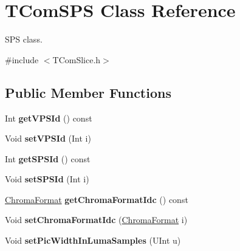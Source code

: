 \hypertarget{class_t_com_s_p_s}{}\section{T\+Com\+S\+PS Class Reference}
\label{class_t_com_s_p_s}


S\+PS class.  




{\ttfamily \#include $<$T\+Com\+Slice.\+h$>$}

\subsection*{Public Member Functions}
\begin{DoxyCompactItemize}
\item 
\mbox{\label{class_t_com_s_p_s_af446194c266dd719fd5c685de31ae8d3}} 
Int {\bfseries get\+V\+P\+S\+Id} () const
\item 
\mbox{\label{class_t_com_s_p_s_abf700bd075dbfcf5e5478607d9785151}} 
Void {\bfseries set\+V\+P\+S\+Id} (Int i)
\item 
\mbox{\label{class_t_com_s_p_s_aba4394331d1500eb70c98de043d48fa6}} 
Int {\bfseries get\+S\+P\+S\+Id} () const
\item 
\mbox{\label{class_t_com_s_p_s_a55dad154ece4af931cb52abcdc2860ea}} 
Void {\bfseries set\+S\+P\+S\+Id} (Int i)
\item 
\mbox{\label{class_t_com_s_p_s_a30bd50fcecaaded33042906d5219484a}} 
\hyperlink{_type_def_8h_a4a6c51c10f2eb04abc7209db7caff39f}{Chroma\+Format} {\bfseries get\+Chroma\+Format\+Idc} () const
\item 
\mbox{\label{class_t_com_s_p_s_a3a5a3ce8ffec170ab38c2e7846a91b2a}} 
Void {\bfseries set\+Chroma\+Format\+Idc} (\hyperlink{_type_def_8h_a4a6c51c10f2eb04abc7209db7caff39f}{Chroma\+Format} i)
\item 
\mbox{\label{class_t_com_s_p_s_afde1756722dd1460a31504d725854001}} 
Void {\bfseries set\+Pic\+Width\+In\+Luma\+Samples} (U\+Int u)
\item 
\mbox{\label{class_t_com_s_p_s_af7e3d016a35b10c61c9ac1521d847625}} 

\end{DoxyCompactItemize}
